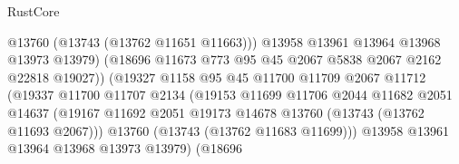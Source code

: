 \begin{lexlean}{RustCore}
\begin{coremodule}
                                          @13760
                                          (@13743 (@13762 @11651 @11663)))
                                        @13958
                                        @13961
                                        @13964
                                        @13968
                                        @13973
                                        @13979)
                                      (@18696
                                        @11673
                                        @773
                                        @95
                                        @45
                                        @2067
                                        @5838
                                        @2067
                                        @2162
                                        @22818
                                        @19027))
                                    (@19327
                                      @1158
                                      @95
                                      @45
                                      @11700
                                      @11709
                                      @2067
                                      @11712
                                      (@19337
                                        @11700
                                        @11707
                                        @2134
                                        (@19153
                                          @11699
                                          @11706
                                          @2044
                                          @11682
                                          @2051
                                          @14637
                                          (@19167
                                            @11692
                                            @2051
                                            @19173
                                            @14678
                                            @13760
                                            (@13743 (@13762 @11693 @2067)))
                                          @13760
                                          (@13743 (@13762 @11683 @11699)))
                                        @13958
                                        @13961
                                        @13964
                                        @13968
                                        @13973
                                        @13979)
                                      (@18696

\end{coremodule}
\end{lexlean}
